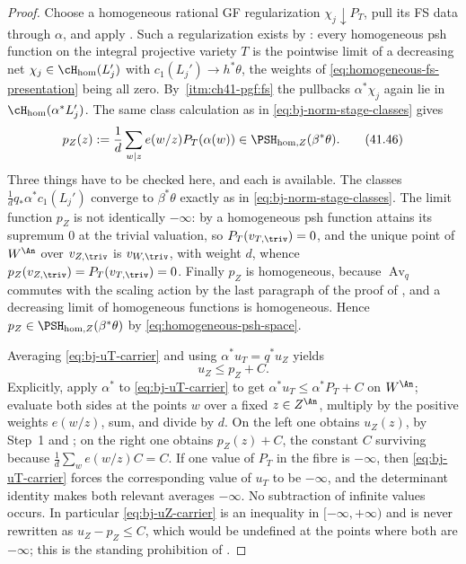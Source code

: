 \begin{proof}
Choose a homogeneous rational GF regularization
$\chi_j\downarrow P_T$, pull its FS data through $\alpha$, and apply
.  Such a regularization exists by
: every homogeneous psh function on the
integral projective variety $T$ is the pointwise limit of a decreasing net
$\chi_j\in\cH_{\mathrm{hom}}(L_j')$ with $c_1(L_j')\to h^*\theta$, the
weights of \eqref{eq:homogeneous-fs-presentation} being all zero.  By
\,\cref{itm:ch41-pgf:fs} the pullbacks
$\alpha^*\chi_j$ again lie in $\cH_{\mathrm{hom}}(\alpha^*L_j')$.
The same class calculation as in
\eqref{eq:bj-norm-stage-classes} gives
\[
 p_Z(z):=\frac1d\sum_{w\mid z}e(w/z)P_T(\alpha(w))
 \in\PSH_{\mathrm{hom},Z}(\beta^*\theta).
\tag{41.46}\label{eq:bj-pZ-carrier}
\]
Three things have to be checked here, and each is available.  The classes
$\frac1dq_*\alpha^*c_1(L_j')$ converge to $\beta^*\theta$ exactly as in
\eqref{eq:bj-norm-stage-classes}.  The limit function $p_Z$ is not
identically $-\infty$: by
 a homogeneous psh function
attains its supremum $0$ at the trivial valuation, so
$P_T(v_{T,\triv})=0$, and the unique point of $W^{\An}$ over
$v_{Z,\triv}$ is $v_{W,\triv}$, with weight $d$, whence
$p_Z(v_{Z,\triv})=P_T(v_{T,\triv})=0$.  Finally $p_Z$ is homogeneous,
because $\operatorname{Av}_q$ commutes with the scaling action by the last
paragraph of the proof of , and a
decreasing limit of homogeneous functions is homogeneous.  Hence
$p_Z\in\PSH_{\mathrm{hom},Z}(\beta^*\theta)$ by
\eqref{eq:homogeneous-psh-space}.

Averaging \eqref{eq:bj-uT-carrier} and using
$\alpha^*u_T=q^*u_Z$ yields
\[
                              u_Z\le p_Z+C.
\tag{41.47}\label{eq:bj-uZ-carrier}
\]
Explicitly, apply $\alpha^*$ to \eqref{eq:bj-uT-carrier} to get
$\alpha^*u_T\le\alpha^*P_T+C$ on $W^{\An}$; evaluate both sides at the
points $w$ over a fixed $z\in Z^{\An}$, multiply by the positive
weights $e(w/z)$, sum, and divide by $d$.  On the left one obtains
$u_Z(z)$, by Step~1 and ; on the right one
obtains $p_Z(z)+C$, the constant $C$ surviving because
$\frac1d\sum_we(w/z)C=C$.
If one value of $P_T$ in the fibre is $-\infty$, then
\eqref{eq:bj-uT-carrier} forces the corresponding value of $u_T$ to be
$-\infty$, and the determinant identity makes both relevant averages
$-\infty$.  No subtraction of infinite values occurs.  In particular
\eqref{eq:bj-uZ-carrier} is an inequality in $[-\infty,+\infty)$ and is
never rewritten as $u_Z-p_Z\le C$, which would be undefined at the points
where both are $-\infty$; this is the standing prohibition of
.


\end{proof}
